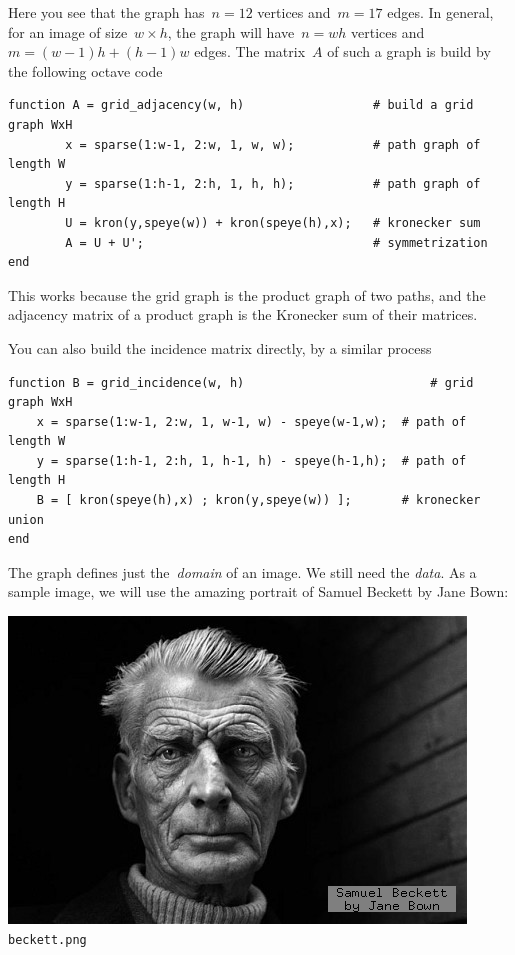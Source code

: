 Here you see that the graph has~$n=12$ vertices and~$m=17$ edges.
In general, for an image of size~$w\times h$, the graph will have~$n=wh$
vertices and~$m=(w-1)h+(h-1)w$ edges.  The matrix~$A$ of such a graph is
build by the following octave code

\begin{verbatim}
function A = grid_adjacency(w, h)                  # build a grid graph WxH
        x = sparse(1:w-1, 2:w, 1, w, w);           # path graph of length W
        y = sparse(1:h-1, 2:h, 1, h, h);           # path graph of length H
        U = kron(y,speye(w)) + kron(speye(h),x);   # kronecker sum
        A = U + U';                                # symmetrization
end
\end{verbatim}

This works because the grid graph is the product graph of two paths, and the
adjacency matrix of a product graph is the Kronecker sum of their matrices.

You can also build the incidence matrix directly, by a similar process

\begin{verbatim}
function B = grid_incidence(w, h)                          # grid graph WxH
	x = sparse(1:w-1, 2:w, 1, w-1, w) - speye(w-1,w);  # path of length W
	y = sparse(1:h-1, 2:h, 1, h-1, h) - speye(h-1,h);  # path of length H
	B = [ kron(speye(h),x) ; kron(y,speye(w)) ];       # kronecker union
end
\end{verbatim}

The graph defines just the~\emph{domain} of an image.  We still need the
\emph{data}.  As a sample image, we will use the amazing portrait of Samuel
Beckett by Jane Bown:

\includegraphics{i/beckett.png}
\verb+beckett.png+

